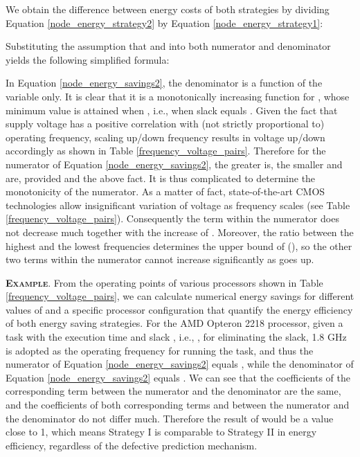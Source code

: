 \documentclass[12pt]{elsarticle}
\begin{document}
We obtain the difference between energy costs of both strategies by dividing Equation \ref{node_energy_strategy2} by Equation \ref{node_energy_strategy1}:

\vspace{-4mm}



Substituting the assumption that  and  into both numerator and denominator yields the following simplified formula:

\vspace{-4mm}



In Equation \ref{node_energy_savings2}, the denominator is a function of the variable  only. It is clear that it is a monotonically increasing function for , whose minimum value is attained when , i.e., when slack  equals . Given the fact that supply voltage has a positive correlation with (not strictly proportional to) operating frequency, scaling up/down frequency results in voltage up/down accordingly as shown in Table \ref{frequency_voltage_pairs}. Therefore for the numerator of Equation \ref{node_energy_savings2}, the greater  is, the smaller  and  are, provided  and the above fact. It is thus complicated to determine the monotonicity of the numerator. As a matter of fact, state-of-the-art CMOS technologies allow insignificant variation of voltage as frequency scales (see Table \ref{frequency_voltage_pairs}). Consequently the term  within the numerator does not decrease much together with the increase of . Moreover, the ratio between the highest and the lowest frequencies determines the upper bound of  (), so the other two terms within the numerator cannot increase significantly as  goes up.

\vspace{1mm}
\noindent\textsc{\textbf{Example}}. From the operating points of various processors shown in Table \ref{frequency_voltage_pairs}, we can calculate numerical energy savings for different values of  and a specific processor configuration that quantify the energy efficiency of both energy saving strategies. For the AMD Opteron 2218 processor, given a task with the execution time  and slack , i.e., , for eliminating the slack, 1.8 GHz is adopted as the operating frequency for running the task, and thus the numerator of Equation \ref{node_energy_savings2} equals , while the denominator of Equation \ref{node_energy_savings2} equals . We can see that the coefficients of the corresponding term  between the numerator and the denominator are the same, and the coefficients of both corresponding terms  and  between the numerator and the denominator do not differ much. Therefore the result of  would be a value close to 1, which means \textsf{Strategy I} is comparable to \textsf{Strategy II} in energy efficiency, regardless of the defective prediction mechanism.
\end{document}
